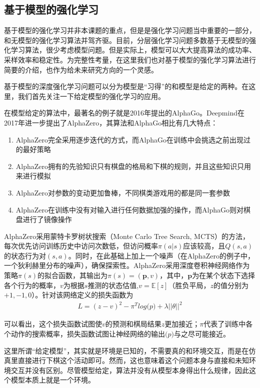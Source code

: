     \subsection{基于模型的强化学习}
    基于模型的强化学习并非本课题的重点，但是是强化学习问题当中重要的一部分，和无模型的强化学习算法并驾齐驱。目前，分层强化学习问题多数基于无模型的强化学习算法，很少考虑模型问题。但是实际上，模型可以大大提高算法的成功率、采样效率和稳定性。为完整性考量，在这里我们也对基于模型的强化学习算法进行简要的介绍，也作为给未来研究方向的一个灵感。
    
    基于模型的深度强化学习问题可以分为模型是``习得''的和模型是给定的两种。在这里，我们首先关注一下给定模型的强化学习的应用。
      \par 在模型给定的算法中，最著名的例子就是2016年提出的AlphaGo\cite{AlphaGo}。Deepmind在2017年进一步提出了AlphaZero\cite{AlphaZero}，其算法和AlphaGo相比有几大特点：
      \begin{enumerate}
        \item AlphaZero完全采用逐步迭代的方式，而AlphaGo在训练中会挑选之前出现过的最好策略
        \item AlphaZero拥有的先验知识只有棋盘的格局和下棋的规则，并且这些知识只用来进行模拟
        \item AlphaZero对参数的变动更加鲁棒，不同棋类游戏用的都是同一套参数
        \item AlphaZero在训练中没有对输入进行任何数据加强的操作，而AlphaGo则对棋盘进行了镜像操作
      \end{enumerate}
      \par AlphaZero采用蒙特卡罗树状搜索（Monte Carlo Tree Search, MCTS\cite{Sutton_book}）的方法，每次优先访问训练历史中访问次数低，但访问概率$\pi(a|s)$应该较高，且$Q(s, a)$的状态行为对$(s, a)$。同时，在此基础上加上一个噪声（在AlphaZero的例子中，一个狄利赫里分布的噪声），确保探索性。AlphaZero采用深度卷积神经网络作为策略$\pi(s)$的拟合函数，其输出为$\pi(s) = (\mathbf{p}, v)$，其中，$\mathbf{p}$为在某个状态下选择各个行为的概率，$v$为根据$s$推测的状态估值,$v = \mathbb{E}[z]$（胜负平局，$z$的值分别为$+1, -1, 0$）。针对该网络定义的损失函数为
      \begin{align}
        L = (z-v)^2 - \pi^T log \mathbf(p) + \lambda ||\theta||^2
      \end{align}
      \par 可以看出，这个损失函数试图使$v$的预测和棋局结果$z$更加接近；$\pi$代表了训练中各个动作的搜索概率，损失函数试图让神经网络的输出$\mathbf(p)$与之尽可能接近。
      \par 这里所谓“给定模型”，其实就是环境是已知的，不需要真的和环境交互，而是在仿真里直接进行下棋这个活动即可。然而，这也意味着这个问题本身与直接和未知环境交互并没有区别。尽管模型给定，算法并没有从模型本身得出什么规律，因此这个模型本质上就是一个环境。\par
